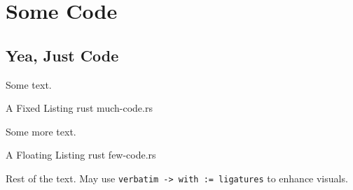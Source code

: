 \chapter{Some Code}
\section{Yea, Just Code}

Some text.

\fixedlisting
    {A Fixed Listing}
    {rust}
    {much-code.rs}

Some more text.

\floatinglisting
    {A Floating Listing}
    {rust}
    {few-code.rs}
    
Rest of the text. May use \verb+verbatim -> with := ligatures+ to enhance visuals.

